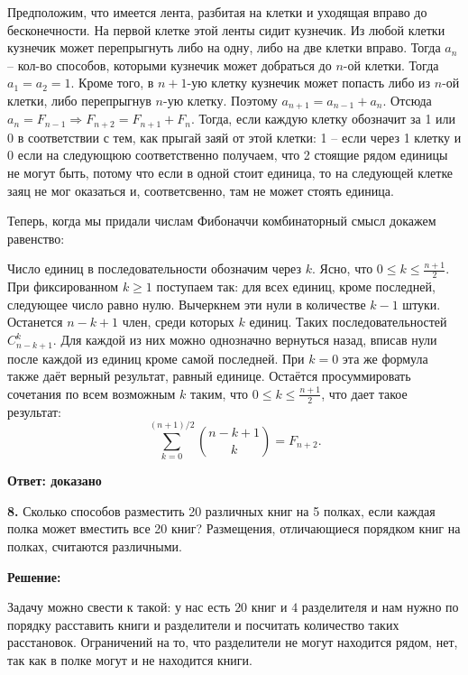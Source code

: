 \documentclass[a4paper,12pt]{article} %
\begin{document}
Предположим, что имеется лента, разбитая на клетки и уходящая вправо до бесконечности. На первой клетке этой ленты сидит кузнечик. Из любой клетки кузнечик может перепрыгнуть либо на одну, либо на две клетки вправо. Тогда $a_n$ -- кол-во  способов, которыми кузнечик может добраться до $n$-ой клетки. Тогда $a_1 = a_2 = 1$. Кроме того, в $n + 1$-ую клетку кузнечик может попасть либо из $n$-ой клетки, либо перепрыгнув $n$-ую клетку. Поэтому $a_{n + 1} = a_{n - 1} + a_n$. Отсюда $a_n = F_{n - 1} \Rightarrow F_{n+2} = F_{n + 1} + F_{n}$. Тогда, если каждую клетку обозначит за 1 или 0 в соответствии с тем, как прыгай заяй от этой клетки: 1 -- если через 1 клетку  и 0 если на следующюю соответственно получаем, что 2 стоящие рядом единицы не могут быть, потому что если в одной стоит единица, то на следующей клетке заяц не мог оказаться и, соответсвенно, там не может стоять единица.

Теперь, когда мы придали числам Фибоначчи комбинаторный смысл докажем равенство:

Число единиц в последовательности обозначим через $k$. Ясно, что  $0\leqslant k\leqslant\frac{n+1}{2}.$ При фиксированном $k\geqslant1$ поступаем так: для всех единиц, кроме последней, следующее число равно нулю. Вычеркнем эти нули в количестве $k-1$ штуки. Останется $n-k+1$ член, среди которых $k$ единиц. Таких последовательностей $C^k_{n-k+1}$. Для каждой из них можно однозначно вернуться назад, вписав нули после каждой из единиц кроме самой последней. При $k=0$ эта же формула также даёт верный результат, равный единице. Остаётся просуммировать сочетания по всем возможным $k$ таким, что $0\leqslant k\leqslant\frac{n+1}{2}$, что дает такое результат: \[  \sum\limits_{k = 0}^{(n+1)/2} {{n-k+1 \choose k}} = F_{n+2} .\]


\begin{flushright}
\begin{large}
\textbf {Ответ: доказано}
\end{large}
\end{flushright}

{\bf 8.} Сколько способов разместить 20 различных книг на 5 полках, если
каждая полка может вместить все 20 книг? Размещения, отличающиеся
порядком книг на полках, считаются различными.
\begin{center}
\bfseries
{\Large Решение: }
\end{center}

Задачу можно свести к такой: у нас есть $20$ книг и $4$ разделителя и нам нужно по порядку расставить книги и разделители и посчитать количество таких расстановок. Ограничений на то, что разделители не могут находится рядом, нет, так как в полке могут и не находится книги.
\end{document}
